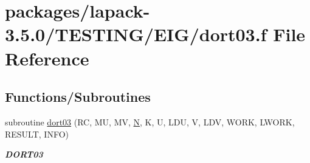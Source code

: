 \hypertarget{dort03_8f}{}\section{packages/lapack-\/3.5.0/\+T\+E\+S\+T\+I\+N\+G/\+E\+I\+G/dort03.f File Reference}
\label{dort03_8f}
\subsection*{Functions/\+Subroutines}
\begin{DoxyCompactItemize}
\item 
subroutine \hyperlink{group__double__eig_gab5b5f991af6cf4cbd658c1ceb7dd70bd}{dort03} (R\+C, M\+U, M\+V, \hyperlink{polmisc_8c_a0240ac851181b84ac374872dc5434ee4}{N}, K, U, L\+D\+U, V, L\+D\+V, W\+O\+R\+K, L\+W\+O\+R\+K, R\+E\+S\+U\+L\+T, I\+N\+F\+O)
\begin{DoxyCompactList}\small\item\em {\bfseries D\+O\+R\+T03} \end{DoxyCompactList}\end{DoxyCompactItemize}
